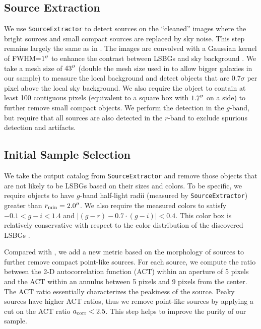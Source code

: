\documentclass[twocolumn,astrosymb,twocolappendix]{aastex631}
\newcommand{\code}[1]{\texttt{#1}}
\begin{document}
\begin{CJK*}{UTF8}{gbsn}
\subsection{Source Extraction}
We use \code{SourceExtractor} to detect sources on the ``cleaned'' images where the bright sources and small compact sources are replaced by sky noise. This step remains largely the same as in . The images are convolved with a Gaussian kernel of FWHM=$1\mbox{$^{\prime\prime}$}$ to enhance the contrast between LSBGs and sky background \citep[e.g.,][]{Irwin1985,Akhlaghi2015,Greco2018}. We take a mesh size of $43\mbox{$^{\prime\prime}$}$ (double the mesh size used in  to allow bigger galaxies in our sample) to measure the local background and detect objects that are 0.7$\sigma$ per pixel above the local sky background. We also require the object to contain at least 100 contiguous pixels (equivalent to a square box with $1.7\mbox{$^{\prime\prime}$}$ on a side) to further remove small compact objects. We perform the detection in the $g$-band, but require that all sources are also detected in the $r$-band to exclude spurious detection and artifacts.
    
\subsection{Initial Sample Selection} 
We take the output catalog from \code{SourceExtractor} and remove those objects that are not likely to be LSBGs based on their sizes and colors. To be specific, we require objects to have $g$-band half-light radii (measured by \code{SourceExtractor}) greater than $r_{\rm min} = 2.0\mbox{$^{\prime\prime}$}$. We also require the measured colors to satisfy $-0.1 < g-i < 1.4$ and $|(g-r) - 0.7\cdot (g-i)| < 0.4$. This color box is relatively conservative with respect to the color distribution of the discovered LSBGs \citep[e.g.,][]{SAGA-I,Greco2018,Zaritsky2019,Tanoglidis2021}. 

Compared with , we add a new metric based on the morphology of sources to further remove compact point-like sources. For each source, we compute the ratio between the 2-D autocorrelation function (ACT) within an aperture of 5 pixels and the ACT within an annulus between 5 pixels and 9 pixels from the center. The ACT ratio essentially characterizes the peakiness of the source. Peaky sources have higher ACT ratios, thus we remove point-like sources by applying a cut on the ACT ratio $a_{\rm corr} < 2.5$. This step helps to improve the purity of our sample.


\end{CJK*}
\end{document}
